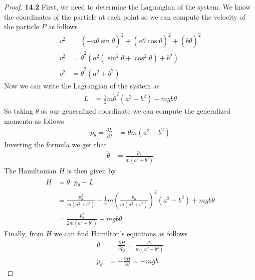 \documentclass[11pt]{article}
\theoremstyle{definition}
\begin{document}
\cleardoublepage
\begin{proof}{\textbf{14.2}}
    First, we need to determine the Lagrangian of the system. We know the
    coordinates of the particle at each point so we can compute
    the velocity of the particle $P$ as follows
    \begin{align*}
        v^2 &= (-a\dot\theta\sin\theta)^2 + (a\dot\theta\cos \theta)^2 + (b\dot\theta)^2\\
        v^2 &= \dot\theta^2(a^2(\sin^2\theta + \cos^2\theta) + b^2)\\
        v^2 &= \dot\theta^2(a^2 + b^2)
    \end{align*}
    Now we can write the Lagrangian of the system as
    \begin{align*}
        L &= \frac{1}{2}m\dot\theta^2(a^2 + b^2) - mgb\theta
    \end{align*}
    So taking $\theta$ as our generalized coordinate we can compute
    the generalized momenta as follows
    \begin{align*}
        p_\theta = \frac{\partial L}{\partial \dot\theta}
        &= \dot\theta m(a^2 + b^2)
    \end{align*}
    Inverting the formula we get that
    \begin{align*}
        \dot\theta &= \frac{p_\theta}{m(a^2 + b^2)}
    \end{align*}
    The Hamiltonian $H$ is then given by
    \begin{align*}
        H &= \dot\theta\cdot p_\theta - L\\
        &= \frac{p_\theta^2}{m(a^2 + b^2)}
        - \frac{1}{2}m\left(\frac{p_\theta}{m(a^2 + b^2)}\right)^2(a^2 + b^2)
        + mgb\theta\\
        &= \frac{p_\theta^2}{2m(a^2 + b^2)}
        + mgb\theta
    \end{align*}
    Finally, from $H$ we can find Hamilton's equations as follows
    \begin{align*}
        \dot\theta &= \frac{\partial H}{\partial p_\theta}
        = \frac{p_\theta}{m(a^2 + b^2)}\\
        \dot p_\theta &= -\frac{\partial H}{\partial \theta}
        = -mgb
    \end{align*}    
\end{proof}
\cleardoublepage
\end{document}
